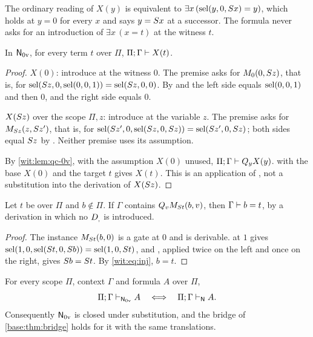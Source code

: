 The ordinary reading of $X(y)$ is equivalent to
$\exists x\,(\operatorname{sel}(y,0,S x)=y)$, which holds at $y=0$ for every $x$ and
says $y=S x$ at a successor.  The formula never asks for an introduction
of $\exists x\,(x=t)$ at the witness $t$.

\begin{lemma}
\label{wit:lem:packet-0v}
In $\mathsf{N}_{0\mathrm v}$, for every term $t$ over $\Pi$,
$\Pi;\Gamma\vdash X(t)$.
\end{lemma}

\begin{proof}
$X(0)$: introduce at the witness $0$.  The premise asks for
$M_0(0,S z)$, that is, for
$\operatorname{sel}(S z,0,\operatorname{sel}(0,0,1))=\operatorname{sel}(S z,0,0)$.  By  and
 the left side equals $\operatorname{sel}(0,0,1)$ and then $0$, and the right
side equals $0$.

$X(S z)$ over the scope $\Pi,z$: introduce at the variable $z$.  The
premise asks for $M_{S z}(z,S z')$, that is, for
$\operatorname{sel}(S z',0,\operatorname{sel}(S z,0,S z))=\operatorname{sel}(S z',0,S z)$; both sides
equal $S z$ by .  Neither premise uses its assumption.

By \cref{wit:lem:qc-0v}, with the assumption $X(0)$ unused,
$\Pi;\Gamma\vdash Q_{y}X(y)$.   with the base $X(0)$ and the
target $t$ gives $X(t)$.  This is an application of , not a
substitution into the derivation of $X(S z)$.
\end{proof}

\begin{lemma}
\label{wit:lem:alias-0v}
Let $t$ be over $\Pi$ and $b\notin\Pi$.  If $\Gamma$ contains
$Q_{v}M_{S t}(b,v)$, then $\Gamma\vdash b=t$, by a derivation in which
no $D_{,}$ is introduced.
\end{lemma}

\begin{proof}
The instance $M_{S t}(b,0)$ is a gate at $0$ and is derivable.
 at $1$ gives
$\operatorname{sel}(1,0,\operatorname{sel}(S t,0,S b))=\operatorname{sel}(1,0,S t)$, and ,
applied twice on the left and once on the right, gives $S b=S t$.
By \eqref{wit:eq:inj}, $b=t$.
\end{proof}

\begin{theorem}
\label{wit:thm:zero-or-variable}
For every scope $\Pi$, context $\Gamma$ and formula $A$ over $\Pi$,
\[
 \Pi;\Gamma\vdash_{\mathsf{N}_{0\mathrm v}}A
 \quad\Longleftrightarrow\quad
 \Pi;\Gamma\vdash_{\mathsf{N}}A .
\]
Consequently $\mathsf{N}_{0\mathrm v}$ is closed under substitution, and the
bridge of \cref{base:thm:bridge} holds for it with the same translations.
\end{theorem}

